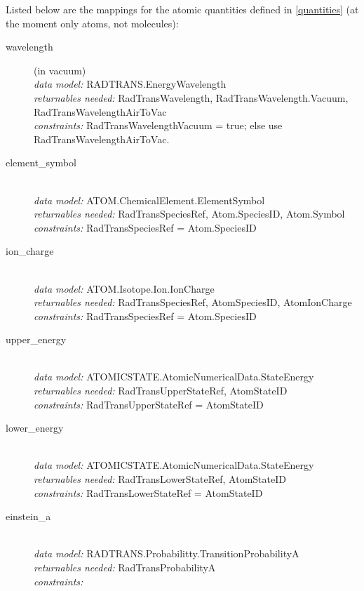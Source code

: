 \documentclass[11pt,a4paper]{ivoa}
\begin{document}
Listed below are the mappings for the atomic quantities defined in \ref{quantities} (at the moment only atoms, not molecules):

\renewcommand{\descriptionlabel}[1]{\hspace{\labelsep}\texttt{#1}}
\begin{description}
		
\item [wavelength] (in vacuum)\hfill\\
        \textit{data model:} RADTRANS.EnergyWavelength\\
	\textit{returnables needed:} RadTransWavelength, RadTransWavelength.Vacuum, RadTransWavelengthAirToVac\\
	\textit{constraints:} RadTransWavelengthVacuum = true; else use RadTransWavelengthAirToVac.\\
	
\item [element\_symbol] \hfill\\
	\textit{data model:} ATOM.ChemicalElement.ElementSymbol\\
	\textit{returnables needed:} RadTransSpeciesRef, Atom.SpeciesID, Atom.Symbol
	\textit{constraints:}  RadTransSpeciesRef = Atom.SpeciesID 
		
\item [ion\_charge]\hfill\\
	\textit{data model:} ATOM.Isotope.Ion.IonCharge\\
	\textit{returnables needed:} RadTransSpeciesRef, AtomSpeciesID, AtomIonCharge\\
	\textit{constraints:}  RadTransSpeciesRef = Atom.SpeciesID 
	
\item [upper\_energy]\hfill\\
	\textit{data model:} ATOMICSTATE.AtomicNumericalData.StateEnergy\\
	\textit{returnables needed:} RadTransUpperStateRef, AtomStateID\\
	\textit{constraints:}  RadTransUpperStateRef = AtomStateID 

\item [lower\_energy]\hfill\\
	\textit{data model:} ATOMICSTATE.AtomicNumericalData.StateEnergy\\
	\textit{returnables needed:} RadTransLowerStateRef, AtomStateID\\
	\textit{constraints:}  RadTransLowerStateRef = AtomStateID

\item [einstein\_a]\hfill\\
	\textit{data model:}  RADTRANS.Probabilitty.TransitionProbabilityA\\
	\textit{returnables needed:} RadTransProbabilityA\\
         \textit{constraints:} 
         

\end{description}
\end{document}
